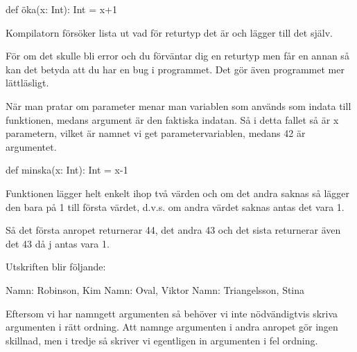 
\ExerciseSolution{\ExeWeekTHREE}

\Task 

\Subtask 
\begin{REPLnonum}
def öka(x: Int): Int = x+1
\end{REPLnonum}

\Subtask {}

\Subtask Kompilatorn försöker lista ut vad för returtyp det är och lägger till det själv.

\Subtask För om det skulle bli error och du förväntar dig en returtyp men får en annan så kan det betyda att du har en bug i programmet. Det gör även programmet mer lättläsligt.

\Subtask När man pratar om parameter menar man variablen som används som indata till funktionen, medans argument är den faktiska indatan. Så i detta fallet så är x parametern, vilket är namnet vi get parametervariablen, medans 42 är argumentet. 

\Subtask {}

\Subtask 
\begin{REPLnonum}
def minska(x: Int): Int = x-1
\end{REPLnonum}

\Subtask {}

\Task 

\Subtask {}

\Subtask {}

\Subtask {}

\Subtask {}

\Task 
Funktionen lägger helt enkelt ihop två värden och om det andra saknas så lägger den bara på 1 till första värdet, d.v.s. om andra värdet saknas antas det vara 1.

Så det första anropet returnerar 44, det andra 43 och det sista returnerar även det 43 då j antas vara 1.


\Task 

\Subtask 
Utskriften blir följande:
\begin{REPLnonum}
Namn: Robinson, Kim
Namn: Oval, Viktor
Namn: Triangelsson, Stina
\end{REPLnonum}
Eftersom vi har namngett argumenten så behöver vi inte nödvändigtvis skriva argumenten i rätt ordning. Att namnge argumenten i andra anropet gör ingen skillnad, men i tredje så skriver vi egentligen in argumenten i fel ordning. 

